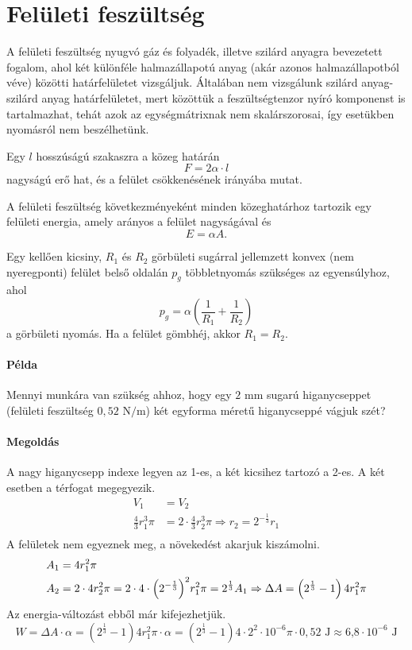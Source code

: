 \documentclass[12pt,a4paper]{scrartcl}
\begin{document}
\section{Felületi feszültség}
A felületi feszültség nyugvó gáz és folyadék, illetve szilárd anyagra bevezetett fogalom, ahol két különféle halmazállapotú anyag (akár azonos halmazállapotból véve) közötti határfelületet vizsgáljuk. Általában nem vizsgálunk szilárd anyag-szilárd anyag határfelületet, mert közöttük a feszültségtenzor nyíró komponenst is tartalmazhat, tehát azok az egységmátrixnak nem skalárszorosai, így esetükben nyomásról nem beszélhetünk.

Egy $l$ hosszúságú szakaszra a közeg határán
\[F = 2\alpha  \cdot l\]
nagyságú erő hat, és a felület csökkenésének irányába mutat.

A felületi feszültség következményeként minden közeghatárhoz tartozik egy felületi energia, amely arányos a felület nagyságával és 
\[E = \alpha A.\]

Egy kellően kicsiny, $R_1$ és $R_2$ görbületi sugárral jellemzett konvex (nem nyeregponti) felület belső oldalán $p_g$ többletnyomás szükséges az egyensúlyhoz, ahol
\[{p_g} = \alpha \left( {\frac{1}{{{R_1}}} + \frac{1}{{{R_2}}}} \right)\]
a görbületi nyomás. Ha a felület gömbhéj, akkor $R_1 = R_2$.
\footnotesize
\paragraph{Példa}
Mennyi munkára van szükség ahhoz, hogy egy $2\text{ mm}$ sugarú higanycseppet (felületi feszültség $0{,}52\text{ N}/\text{m}$) két egyforma méretű higanycseppé vágjuk szét?

\paragraph{Megoldás}
A nagy higanycsepp indexe legyen az 1-es, a két kicsihez tartozó a 2-es. A két esetben a térfogat megegyezik.
\[\begin{aligned}
  {V_1} &  = {V_2} \\ 
  \frac{4}{3}r_1^3\pi  &  = 2 \cdot \frac{4}{3}r_2^3\pi  \Rightarrow {r_2} = {2^{ - \frac{1}{3}}}{r_1} \\ 
\end{aligned} \]
A felületek nem egyeznek meg, a növekedést akarjuk kiszámolni.
\[\begin{gathered}
  {A_1} = 4r_1^2\pi  \hfill \\
  {A_2} = 2 \cdot 4r_2^2\pi  = 2 \cdot 4 \cdot {\left( {{2^{ - \frac{1}{3}}}} \right)^2}r_1^2\pi  = {2^{\frac{1}{3}}}{A_1} \Rightarrow \Delta A = \left( {{2^{\frac{1}{3}}} - 1} \right)4r_1^2\pi  \hfill \\ 
\end{gathered} \]
Az energia-változást ebből már kifejezhetjük.
\[W = \Delta A \cdot \alpha  = \left( {{2^{\frac{1}{3}}} - 1} \right)4r_1^2\pi  \cdot \alpha  = \left( {{2^{\frac{1}{3}}} - 1} \right)4 \cdot {2^2} \cdot {10^{ - 6}}\pi  \cdot 0{,}52{\text{ J}} \approx {\text{6{,}8}} \cdot {\text{1}}{{\text{0}}^{ - 6}}{\text{ J}}\]
\end{document}
